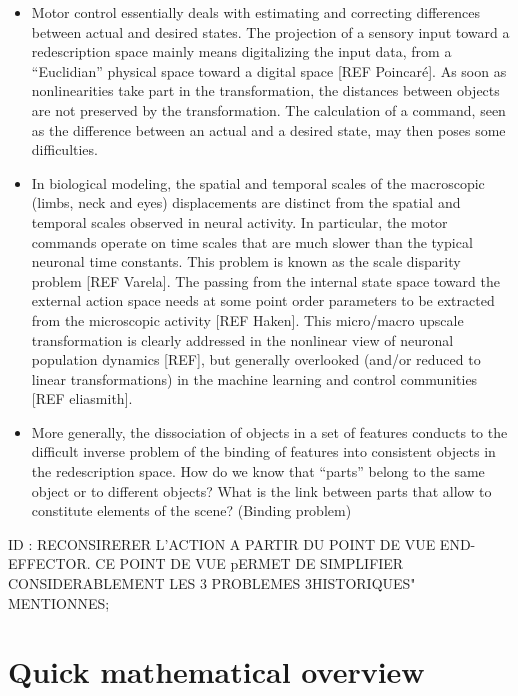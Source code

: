 \documentclass[11pt]{article}
\begin{document}
\begin{itemize}
	\item Motor control essentially deals with estimating and correcting differences between actual and desired states. The projection of a sensory input toward a redescription space mainly means digitalizing the input data, from a ``Euclidian'' physical space toward a digital space [REF Poincaré]. As soon as nonlinearities take part in the transformation, the distances between objects are not preserved by the transformation. The calculation of a command, seen as  the difference between an actual and a desired state, may then poses some difficulties. 
	\item In biological modeling, the spatial and temporal scales of the macroscopic (limbs, neck and eyes) displacements are distinct from the spatial and temporal scales observed in neural activity. In particular, the motor commands operate on time scales that are much slower than the typical neuronal time constants. This problem is known as the scale disparity problem [REF Varela]. The passing from the internal state space toward the external action space needs at some point order parameters to be extracted from the microscopic activity [REF Haken]. This micro/macro upscale transformation is clearly addressed in the nonlinear view of neuronal population dynamics [REF], but generally overlooked (and/or reduced to linear transformations) in the machine learning and control communities [REF eliasmith].     
	\item More generally, the dissociation of objects in a set of features conducts to the difficult inverse problem of the binding of features into consistent objects in the redescription space. How do we know that ``parts'' belong to the same object or to different objects? What is the link between parts that allow to constitute elements of the scene? (Binding problem)
\end{itemize}



ID : RECONSIRERER L'ACTION A PARTIR DU POINT DE VUE END-EFFECTOR. CE POINT DE VUE pERMET DE SIMPLIFIER CONSIDERABLEMENT LES 3 PROBLEMES 3HISTORIQUES" MENTIONNES;

\section{Quick mathematical overview}
\end{document}
